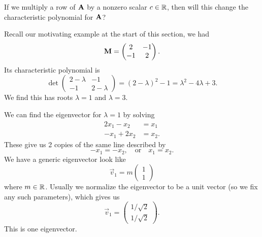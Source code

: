  If we multiply a row of $\mathbf{A}$ by a nonzero scalar
$c\in\mathbb{R}$, then will this change the characteristic polynomial for $\mathbf{A}$?

\begin{example}
Recall our motivating example at the start of this section, we had
\begin{equation}
\mathbf{M} = \begin{pmatrix}2 & -1\\
-1 & 2
\end{pmatrix}.
\end{equation}
Its characteristic polynomial is
\begin{equation}
\det\begin{pmatrix}2-\lambda & -1\\
-1 & 2-\lambda
\end{pmatrix} = (2-\lambda)^{2}-1 = \lambda^{2}-4\lambda+3.
\end{equation}
We find this has roots $\lambda=1$ and $\lambda=3$.

We can find the eigenvector for $\lambda=1$ by solving
\begin{subequations}
  \begin{align}
    2x_{1} -x_{2} &= x_{1}\\
    -x_{1} + 2x_{2} &= x_{2}.
  \end{align}
\end{subequations}
These give us 2 copies of the same line described by
\begin{equation}
-x_{1} = -x_{2},\quad\mbox{or}\quad x_{1}=x_{2}.
\end{equation}
We have a generic eigenvector look like
\begin{equation*}
\vec{v}_{1} = m\begin{pmatrix}1\\1
\end{pmatrix}
\end{equation*}
where $m\in\mathbb{R}$. Usually we normalize the eigenvector to be a unit
vector (so we fix any such parameters), which gives us
\begin{equation}
  \vec{v}_{1} = \begin{pmatrix}1/\sqrt{2}\\
    1/\sqrt{2}
  \end{pmatrix}.
\end{equation}
This is one eigenvector.


\end{example}
